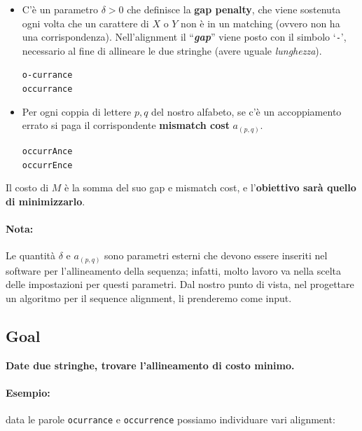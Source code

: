 \begin{itemize}
  \item
        C'è un parametro $\delta>0$ che definisce la \textbf{gap penalty},
        che viene sostenuta ogni volta che un carattere di $X$ o $Y$ non è
        in un matching (ovvero non ha una corrispondenza). Nell'alignment il
        ``\textbf{\emph{gap}}'' viene posto con il simbolo `\texttt{-}',
        necessario al fine di allineare le due stringhe (avere uguale
        \emph{lunghezza}).
        \begin{center}
          \texttt{o-currance}\\
          \texttt{occurrance}
        \end{center}
  \item
        Per ogni coppia di lettere $p,q$ del nostro alfabeto, se c'è un
        accoppiamento errato si paga il corrispondente \textbf{mismatch cost}
        $a_{(p,q)}$.
        \begin{center}
          \texttt{occurrAnce}\\
          \texttt{occurrEnce}
        \end{center}
\end{itemize}


Il costo di $M$ è la somma del suo gap e mismatch cost, e
l'\textbf{obiettivo sarà quello di minimizzarlo}.

\paragraph*{Nota:} Le quantità $\delta$ e $a_{(p,q)}$ sono parametri
esterni che devono essere inseriti nel software per l'allineamento della
sequenza; infatti, molto lavoro va nella scelta delle impostazioni per
questi parametri. Dal nostro punto di vista, nel progettare un algoritmo
per il sequence alignment, li prenderemo come input.

\subsection{Goal}
\begin{myblockquote}
  \textbf{Date due stringhe, trovare l'allineamento di costo minimo.}
\end{myblockquote}

\paragraph*{Esempio:} data le parole \texttt{ocurrance} e
\texttt{occurrence} possiamo individuare vari alignment:

